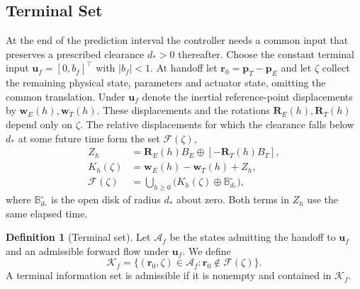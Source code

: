 \documentclass[journal]{IEEEtran}
\theoremstyle{definition}
\newtheorem{definition}{Definition}
\newcommand{\vct}[1]{\boldsymbol{#1}}
\newcommand{\mtx}[1]{\mathbf{#1}}
\begin{document}
\subsection{Terminal Set}
At the end of the prediction interval the controller needs a common
input that preserves a prescribed clearance $d_*>0$ thereafter.
Choose the constant terminal input $\vct u_f=[0,b_f]^\top$ with
$|b_f|<1$. At handoff let $\vct r_0=\vct p_T-\vct p_E$ and let
$\zeta$ collect the remaining physical state, parameters and actuator
state, omitting the common translation. Under $\vct u_f$ denote the
inertial reference-point displacements by $\vct w_E(h),\vct w_T(h)$.
These displacements and the rotations $\mtx R_E(h),\mtx R_T(h)$ depend
only on $\zeta$. The relative displacements for which the clearance
falls below $d_*$ at some future time form the set $\mathcal F(\zeta)$,
\begin{equation}\label{eq:forbidden}
\begin{aligned}
 Z_h&=\mtx R_E(h)B_E\oplus[-\mtx R_T(h)B_T],\\
 K_h(\zeta)&=\vct w_E(h)-\vct w_T(h)+Z_h,\\
 \mathcal F(\zeta)&=\bigcup_{h\ge0}
                  \bigl(K_h(\zeta)\oplus\mathbb B^\circ_{d_*}\bigr),
\end{aligned}
\end{equation}
where $\mathbb B^\circ_{d_*}$ is the open disk of radius $d_*$ about
zero. Both terms in $Z_h$ use the same elapsed time.

\begin{definition}[Terminal set]\label{def:terminal}
Let $\mathcal A_f$ be the states admitting the handoff to $\vct u_f$ and
an admissible forward flow under $\vct u_f$. We define
\begin{equation}\label{eq:terminalset}
 \mathcal K_f=\{(\vct r_0,\zeta)\in\mathcal A_f:
                         \vct r_0\notin\mathcal F(\zeta)\}.
\end{equation}
A terminal information set is admissible if it is nonempty and
contained in $\mathcal K_f$.
\end{definition}
\end{document}
